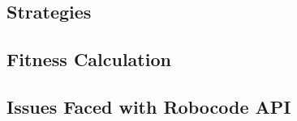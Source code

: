 \subsection{Strategies}
\subsection{Fitness Calculation}
\subsection{Issues Faced with Robocode API}

